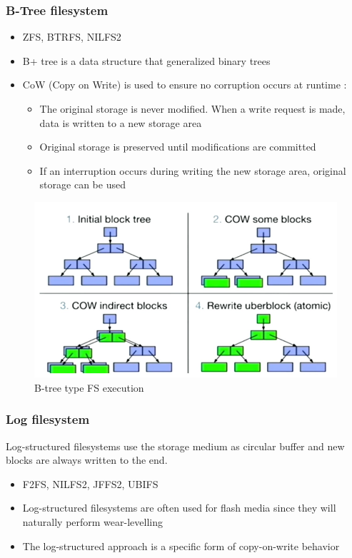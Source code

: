 \documentclass[resume]{subfiles}
\begin{document}
\subsubsection{B-Tree filesystem}
\begin{itemize}
    \item ZFS, BTRFS, NILFS2
    \item B+ tree is a data structure that generalized binary trees
    \item CoW (Copy on Write) is used to ensure no corruption occurs at runtime :
    \begin{itemize}
        \item The original storage is never modified. When a write request is made, data is written to a new storage area
        \item Original storage is preserved until modifications are committed
        \item If an interruption occurs during writing the new storage area, original storage can be used
    \end{itemize}
\end{itemize}

\begin{figure}[H]
    \centering
    \includegraphics[width=0.75\columnwidth]{Figures/fileSystem/b-tree.png}
    \caption{B-tree type FS execution}
    \label{fig:b-tree}
\end{figure}

\subsubsection{Log filesystem}
Log-structured filesystems use the storage medium as circular buffer and new
blocks are always written to the end.
\begin{itemize}
    \item F2FS, NILFS2, JFFS2, UBIFS
    \item Log-structured filesystems are often used for flash media since they will naturally perform wear-levelling
    \item The log-structured approach is a specific form of copy-on-write behavior
\end{itemize}
\end{document}
